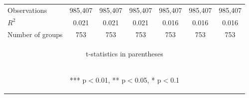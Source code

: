 \documentclass[]{article}
\begin{document}
\begin{center}
\begin{tabular}{lcccccc}
Observations & 985,407 & 985,407 & 985,407 & 985,407 & 985,407 & 985,407 \\
$R^2$ & 0.021 & 0.021 & 0.021 & 0.016 & 0.016 & 0.016 \\
 Number of groups & 753 & 753 & 753 & 753 & 753 & 753 \\ \hline
\multicolumn{7}{c}{\begin{footnotesize} t-statistics in parentheses\end{footnotesize}} \\
\multicolumn{7}{c}{\begin{footnotesize} *** p$<$0.01, ** p$<$0.05, * p$<$0.1\end{footnotesize}} \\
\end{tabular}
\end{center}
\end{document}

